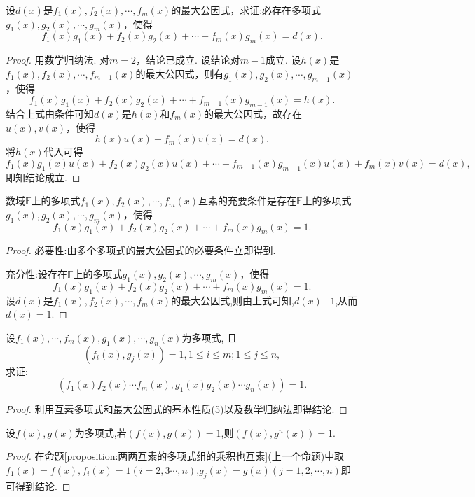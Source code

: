 \documentclass[../../main.tex]{subfiles}%
\begin{document}
\begin{theorem}[多个多项式的最大公因式的必要条件]\label{theorem:多个多项式的最大公因式的必要条件}
设\(d(x)\)是\(f_1(x),f_2(x),\cdots,f_m(x)\)的最大公因式，求证:必存在多项式\(g_1(x),g_2(x),\cdots,g_m(x)\)，使得
\[
f_1(x)g_1(x)+f_2(x)g_2(x)+\cdots + f_m(x)g_m(x)=d(x).
\]
\end{theorem}
\begin{proof}
用数学归纳法. 对\(m = 2\)，结论已成立. 设结论对\(m - 1\)成立. 设\(h(x)\)是\(f_1(x),f_2(x),\cdots,f_{m - 1}(x)\)的最大公因式，则有\(g_1(x),g_2(x),\cdots,g_{m - 1}(x)\)，使得
\[
f_1(x)g_1(x)+f_2(x)g_2(x)+\cdots + f_{m - 1}(x)g_{m - 1}(x)=h(x).
\]
结合上式由条件可知\(d(x)\)是\(h(x)\)和\(f_m(x)\)的最大公因式，故存在\(u(x),v(x)\)，使得
\[
h(x)u(x)+f_m(x)v(x)=d(x).
\]
将\(h(x)\)代入可得
\[
f_1(x)g_1(x)u(x)+f_2(x)g_2(x)u(x)+\cdots + f_{m - 1}(x)g_{m - 1}(x)u(x)+f_m(x)v(x)=d(x),
\]
即知结论成立.
\end{proof}

\begin{corollary}[多个多项式互素的充要条件]\label{corollary:多个多项式互素的充要条件}
数域\(\mathbb{F}\)上的多项式\(f_1(x),f_2(x),\cdots,f_m(x)\)互素的充要条件是存在\(\mathbb{F}\)上的多项式\(g_1(x),g_2(x),\cdots,g_m(x)\)，使得
\[
f_1(x)g_1(x)+f_2(x)g_2(x)+\cdots + f_m(x)g_m(x)=1.
\]
\end{corollary}
\begin{proof}
必要性:由\hyperref[theorem:多个多项式的最大公因式的必要条件]{多个多项式的最大公因式的必要条件}立即得到.

充分性:设存在\(\mathbb{F}\)上的多项式\(g_1(x),g_2(x),\cdots,g_m(x)\)，使得
\[
f_1(x)g_1(x)+f_2(x)g_2(x)+\cdots + f_m(x)g_m(x)=1.
\]
设\(d(x)\)是\(f_1(x),f_2(x),\cdots,f_m(x)\)的最大公因式,则由上式可知,$d(x)\mid 1$,从而$d(x)=1$.
\end{proof}

\begin{proposition}[两两互素的多项式组的乘积也互素]\label{proposition:两两互素的多项式组的乘积也互素}
设\(f_1(x),\cdots,f_m(x),g_1(x),\cdots,g_n(x)\)为多项式, 且
\[
(f_i(x),g_j(x)) = 1, 1\leqslant  i\leqslant  m; 1\leqslant  j\leqslant  n,
\]
求证:
\[
(f_1(x)f_2(x)\cdots f_m(x),g_1(x)g_2(x)\cdots g_n(x)) = 1.
\]
\end{proposition}
\begin{proof}
利用\hyperref[proposition:互素多项式和最大公因式的基本性质]{互素多项式和最大公因式的基本性质(5)}以及数学归纳法即得结论.
\end{proof}

\begin{corollary}\label{corollary:互素多项式n次方后仍互素}
设$f(x),g(x)$为多项式,若$(f(x),g(x))=1$,则$(f(x),g^n(x))=1$.  
\end{corollary}
\begin{proof}
在\hyperref[proposition:两两互素的多项式组的乘积也互素]{命题\ref{proposition:两两互素的多项式组的乘积也互素}(上一个命题)}中取$f_1(x)=f(x),f_i(x)=1(i=2,3\cdots,n)$,$g_j(x)=g(x)(j=1,2,\cdots,n)$即可得到结论.
\end{proof}
\end{document}
